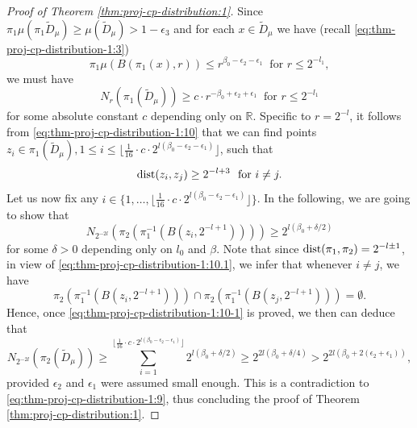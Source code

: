 \documentclass[a4paper,11pt]{amsart}
\theoremstyle{definition}
\numberwithin{equation}{section}
\def\R{\mathbb R}
\DeclareMathOperator{\dist}{{\rm dist}}
\begin{document}
\begin{proof}[Proof of Theorem \ref{thm:proj-cp-distribution:1}]
Since $\pi_1\mu(\pi_1\tilde{D}_\mu)\ge \mu(\tilde{D}_\mu)>1-\epsilon_3$ and for each $x\in \tilde{D}_\mu$ we have (recall \eqref{eq:thm-proj-cp-distribution-1:3}) 
\[
\pi_1\mu(B(\pi_1(x),  r)) \le r^{\beta_0-\epsilon_2-\epsilon_1} \  \textrm{ for } r\le 2^{-l_1}, 
\]
we must have
\begin{equation}\label{eq:thm-proj-cp-distribution-1:10}
N_{r}(\pi_1(\tilde{D}_\mu)) \ge c \cdot  r^{-\beta_0+\epsilon_2+ \epsilon_1} \ \textrm{ for } r\le 2^{-l_1}
\end{equation}
for some absolute constant $c$ depending only on $\R$.  Specific to $r=2^{-l}$,  it follows from \eqref{eq:thm-proj-cp-distribution-1:10} that we can find points $z_i\in \pi_1(\tilde{D}_\mu),  1\le i\le \lfloor\frac{1}{16}\cdot c \cdot  2^{l(\beta_0-\epsilon_2- \epsilon_1)}  \rfloor$, such that 
\begin{equation}\label{eq:thm-proj-cp-distribution-1:10.1}
\dist(z_i,z_j)\ge 2^{-l+3} \ \textrm{ for } i\neq  j.
\end{equation}
Let us now fix any $i\in \{1,\ldots,  \lfloor\frac{1}{16}\cdot c \cdot  2^{l(\beta_0-\epsilon_2- \epsilon_1)}  \rfloor\}$.  
In the following, we are going to show that 
\begin{equation}\label{eq:thm-proj-cp-distribution-1:10-1}
N_{2^{-2l}}\left( \pi_2\left( \pi_1^{-1}(B(z_i,2^{-l+1})) \right) \right) \ge 2^{l(\beta_0+\delta/2)}
\end{equation}
for some $\delta>0$ depending only on $l_0$ and $\beta$.
Note that since  $\dist(\pi_1,\pi_2)= 2^{-l\pm 1}$,  in view of \eqref{eq:thm-proj-cp-distribution-1:10.1}, we infer that  whenever $i\neq j$, we have 
\[
 \pi_2\left( \pi_1^{-1}(B(z_i,2^{-l+1})) \right) \cap  \pi_2\left( \pi_1^{-1}(B(z_j,2^{-l+1})) \right) = \emptyset.
\]
Hence, once \eqref{eq:thm-proj-cp-distribution-1:10-1} is proved,  we then can deduce that 
\[
N_{2^{-2l}}\left( \pi_2(\tilde{D}_\mu)\right) \ge \sum_{i=1}^{\lfloor\frac{1}{16}\cdot c \cdot  2^{l(\beta_0-\epsilon_2- \epsilon_1)}  \rfloor} 2^{l(\beta_0+\delta/2)} \ge 2^{2l(\beta_0+\delta/4)} >  2^{2l(\beta_0+2(\epsilon_2+\epsilon_1))},
\]
provided $\epsilon_2 $ and $\epsilon_1$ were assumed small enough.  This is a contradiction to \eqref{eq:thm-proj-cp-distribution-1:9}, thus concluding the proof of Theorem \ref{thm:proj-cp-distribution:1}.


\end{proof}
\end{document}
